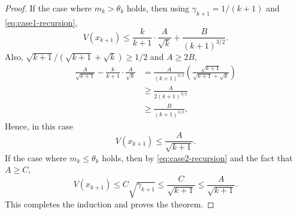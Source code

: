 \documentclass[pdflatex,sn-mathphys-num]{sn-jnl}%
\theoremstyle{thmstyleone}%
\theoremstyle{thmstyletwo}%
\theoremstyle{thmstylethree}%
\begin{document}
\begin{proof}
  If the case where $m_k > \theta_k$ holds, then using $\gamma_{k+1}=1/(k+1)$ and \eqref{eq:case1-recursion},
  \[
    V(x_{k+1}) \leq \frac{k}{k+1}\cdot\frac{A}{\sqrt{k}} + \frac{B}{(k+1)^{3/2}}.
  \]
  Also, $\sqrt{k+1}/(\sqrt{k+1} + \sqrt{k}) \geq 1/2$ and $A \geq 2B$,
  \begin{align*}
    \frac{A}{\sqrt{k+1}} - \frac{k}{k+1}\cdot\frac{A}{\sqrt{k}} &= \frac{A}{(k+1)^{3/2}}\left(\frac{\sqrt{k+1}}{\sqrt{k+1}+\sqrt{k}}\right) \\
                                                                     &\geq\frac{A}{2(k+1)^{3/2}}\\
                                                                     &\geq\frac{B}{(k+1)^{3/2}},
  \end{align*}
  Hence, in this case
  \[
    V(x_{k+1}) \leq \frac{A}{\sqrt{k+1}}.
  \]
  If the case where $m_k \leq \theta_k$ holds, then by \eqref{eq:case2-recursion} and the fact that $A \geq C$,
  \[
    V(x_{k+1}) \leq C\sqrt{\gamma_{k+1}} \leq \frac{C}{\sqrt{k+1}} \leq \frac{A}{\sqrt{k+1}}.
  \]
  This completes the induction and proves the theorem.
\end{proof}
\end{document}

